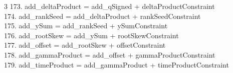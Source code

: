 \documentclass[10pt]{article}
\begin{document}
\begin{multicols}{3}
173. add\_deltaProduct = add\_qSigned + deltaProductConstraint\\
174. add\_rankSeed = add\_deltaProduct + rankSeedConstraint\\
175. add\_ySum = add\_rankSeed + ySumConstraint\\
176. add\_rootSkew = add\_ySum + rootSkewConstraint\\
177. add\_offset = add\_rootSkew + offsetConstraint\\
178. add\_gammaProduct = add\_offset + gammaProductConstraint\\
179. add\_timeProduct = add\_gammaProduct + timeProductConstraint\\
\end{multicols}
\end{document}

